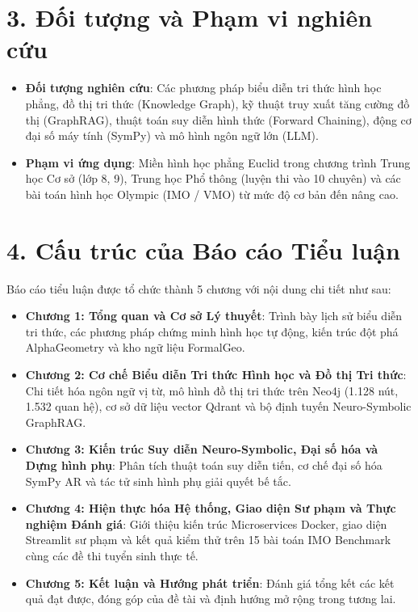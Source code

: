 \section*{3. Đối tượng và Phạm vi nghiên cứu}
\begin{itemize}
    \item \textbf{Đối tượng nghiên cứu}: Các phương pháp biểu diễn tri thức hình học phẳng, đồ thị tri thức (Knowledge Graph), kỹ thuật truy xuất tăng cường đồ thị (GraphRAG), thuật toán suy diễn hình thức (Forward Chaining), động cơ đại số máy tính (SymPy) và mô hình ngôn ngữ lớn (LLM).
    \item \textbf{Phạm vi ứng dụng}: Miền hình học phẳng Euclid trong chương trình Trung học Cơ sở (lớp 8, 9), Trung học Phổ thông (luyện thi vào 10 chuyên) và các bài toán hình học Olympic (IMO / VMO) từ mức độ cơ bản đến nâng cao.
\end{itemize}

\section*{4. Cấu trúc của Báo cáo Tiểu luận}
Báo cáo tiểu luận được tổ chức thành 5 chương với nội dung chi tiết như sau:
\begin{itemize}
    \item \textbf{Chương 1: Tổng quan và Cơ sở Lý thuyết}: Trình bày lịch sử biểu diễn tri thức, các phương pháp chứng minh hình học tự động, kiến trúc đột phá AlphaGeometry và kho ngữ liệu FormalGeo.
    \item \textbf{Chương 2: Cơ chế Biểu diễn Tri thức Hình học và Đồ thị Tri thức}: Chi tiết hóa ngôn ngữ vị từ, mô hình đồ thị tri thức trên Neo4j (1.128 nút, 1.532 quan hệ), cơ sở dữ liệu vector Qdrant và bộ định tuyến Neuro-Symbolic GraphRAG.
    \item \textbf{Chương 3: Kiến trúc Suy diễn Neuro-Symbolic, Đại số hóa và Dựng hình phụ}: Phân tích thuật toán suy diễn tiến, cơ chế đại số hóa SymPy AR và tác tử sinh hình phụ giải quyết bế tắc.
    \item \textbf{Chương 4: Hiện thực hóa Hệ thống, Giao diện Sư phạm và Thực nghiệm Đánh giá}: Giới thiệu kiến trúc Microservices Docker, giao diện Streamlit sư phạm và kết quả kiểm thử trên 15 bài toán IMO Benchmark cùng các đề thi tuyển sinh thực tế.
    \item \textbf{Chương 5: Kết luận và Hướng phát triển}: Đánh giá tổng kết các kết quả đạt được, đóng góp của đề tài và định hướng mở rộng trong tương lai.
\end{itemize}
